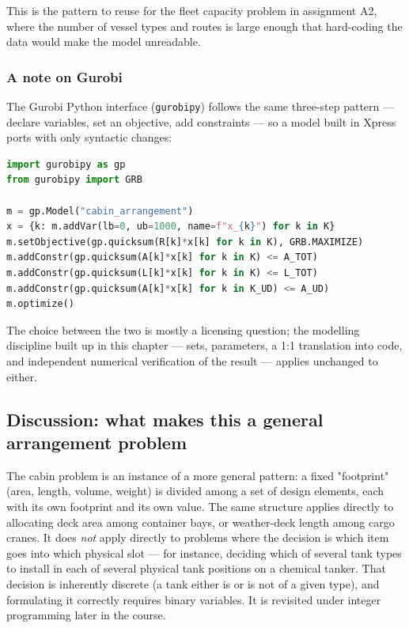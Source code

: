 This is the pattern to reuse for the fleet capacity problem in assignment
A2, where the number of vessel types and routes is large enough that
hard-coding the data would make the model unreadable.

\subsubsection{A note on Gurobi}

The Gurobi Python interface (\texttt{gurobipy}) follows the same
three-step pattern — declare variables, set an objective, add constraints
— so a model built in Xpress ports with only syntactic changes:

\begin{lstlisting}[language=Python]
import gurobipy as gp
from gurobipy import GRB

m = gp.Model("cabin_arrangement")
x = {k: m.addVar(lb=0, ub=1000, name=f"x_{k}") for k in K}
m.setObjective(gp.quicksum(R[k]*x[k] for k in K), GRB.MAXIMIZE)
m.addConstr(gp.quicksum(A[k]*x[k] for k in K) <= A_TOT)
m.addConstr(gp.quicksum(L[k]*x[k] for k in K) <= L_TOT)
m.addConstr(gp.quicksum(A[k]*x[k] for k in K_UD) <= A_UD)
m.optimize()
\end{lstlisting}

The choice between the two is mostly a licensing question; the modelling
discipline built up in this chapter — sets, parameters, a 1:1 translation
into code, and independent numerical verification of the result — applies
unchanged to either.

\subsection{Discussion: what makes this a general arrangement problem}

The cabin problem is an instance of a more general pattern: a fixed
"footprint" (area, length, volume, weight) is divided among a set of
design elements, each with its own footprint and its own value. The same
structure applies directly to allocating deck area among container bays,
or weather-deck length among cargo cranes. It does \emph{not} apply
directly to problems where the decision is which item goes into which
physical slot — for instance, deciding which of several tank types to
install in each of several physical tank positions on a chemical tanker.
That decision is inherently discrete (a tank either is or is not of a
given type), and formulating it correctly requires binary variables. It
is revisited under integer programming later in the course.

